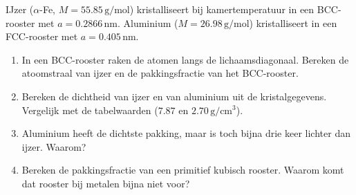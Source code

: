 \begin{oefening}
IJzer (\(\alpha\)-Fe, \(M = 55.85\,\mathrm{g/mol}\)) kristalliseert bij kamertemperatuur in een BCC-rooster met \(a = 0.2866\,\mathrm{nm}\). Aluminium (\(M = 26.98\,\mathrm{g/mol}\)) kristalliseert in een FCC-rooster met \(a = 0.405\,\mathrm{nm}\).

\begin{enumerate}
\item[(a)]
  In een BCC-rooster raken de atomen langs de lichaamsdiagonaal. Bereken de atoomstraal van ijzer en de pakkingsfractie van het BCC-rooster.
\item[(b)]
  Bereken de dichtheid van ijzer en van aluminium uit de kristalgegevens. Vergelijk met de tabelwaarden (\(7.87\) en \(2.70\,\mathrm{g/cm^3}\)).
\item[(c)]
  Aluminium heeft de dichtste pakking, maar is toch bijna drie keer lichter dan ijzer. Waarom?
\item[(d)]
  Bereken de pakkingsfractie van een primitief kubisch rooster. Waarom komt dat rooster bij metalen bijna niet voor?
\end{enumerate}
\end{oefening}
